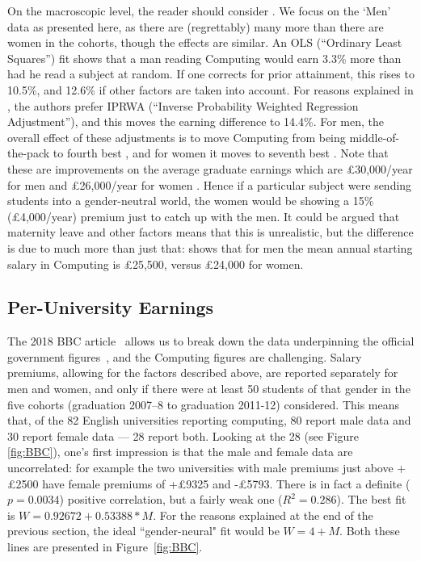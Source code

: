 \documentclass[conference]{IEEEtran}
\begin{document}
On the macroscopic level, the reader should consider \cite[Table
5]{DfE2018d}. We focus on the `Men' data as presented here, as there
are (regrettably) many more than there are women in the cohorts,
though the effects are similar. An OLS (``Ordinary Least Squares'')
fit shows that a man reading Computing would earn 3.3\% more than had
he read a subject at random. If one corrects for prior attainment,
this rises to 10.5\%, and 12.6\% if other factors are taken into
account. For reasons explained in \cite[\S4.2]{DfE2018d}, the authors
prefer IPRWA (``Inverse Probability Weighted Regression Adjustment''),
and this moves the earning difference to 14.4\%. For men, the overall
effect of these adjustments is to move Computing from being
middle-of-the-pack \cite[Figure 15]{DfE2018d} to fourth best
\cite[Figure 17]{DfE2018d}, and for women it moves to seventh best
\cite[Figure 16]{DfE2018d}. Note that these are improvements on the
average graduate earnings which are \pounds30,000/year for men and
\pounds26,000/year for women \cite[p. 37]{DfE2018d}. Hence if a
particular subject were sending students into a gender-neutral world,
the women would be showing a 15\% (\pounds4,000/year) premium just to
catch up with the men.  It could be argued that maternity leave and
other factors means that this is unrealistic, but the difference is
due to much more than just that: \cite[Figure 14]{HESA2018b} shows
that for men the mean annual starting salary in Computing is \pounds 25,500,
versus \pounds24,000 for women.

\subsection{Per-University Earnings}

The 2018 BBC article~\cite{BBC2018f} allows us to break down the data
underpinning the official government figures~\cite{DfE2018d}, and the
Computing figures are challenging. Salary premiums, allowing for the
factors described above, are reported separately for men and women,
and only if there were at least 50 students of that gender in the five
cohorts (graduation 2007--8 to graduation 2011-12) considered. This
means that, of the 82 English universities reporting computing, 80
report male data and 30 report female data --- 28 report both. Looking
at the 28 (see Figure \ref{fig:BBC}), one's first impression is that
the male and female data are uncorrelated: for example the two
universities with male premiums just above +\pounds2500 have female
premiums of +\pounds9325 and -\pounds5793. There is in fact a definite
($p=0.0034$) positive correlation, but a fairly weak one
($R^2=0.286$). The best fit is $W=0.92672+0.53388*M$. For the reasons
explained at the end of the previous section, the ideal
``gender-neural" fit would be $W=4+M$. Both these lines are presented in
Figure~\ref{fig:BBC}.
\end{document}
